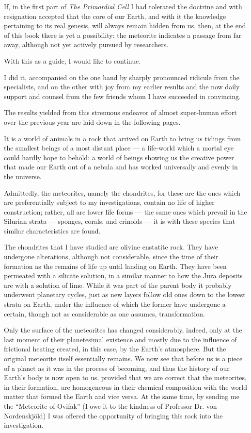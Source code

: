 \documentclass[a4paper, 11pt, oneside]{article}
\begin{document}
If, in the first part of \emph{The Primordial Cell} I had tolerated the doctrine and with resignation accepted that the core of our Earth, and with it the knowledge pertaining to its real genesis, will always remain hidden from us, then, at the end of this book there is yet a possibility: the meteorite indicates a passage from far away, although not yet actively pursued by researchers.

With this as a guide, I would like to continue.

I did it, accompanied on the one hand by sharply pronounced ridicule from the specialists, and on the other with joy from my earlier results and the now daily support and counsel from the few friends whom I have succeeded in convincing.

The results yielded from this strenuous endeavor of almost super-human effort over the previous year are laid down in the following pages.

It is a world of animals in a rock that arrived on Earth to bring us tidings from the smallest beings of a most distant place — a life-world which a mortal eye could hardly hope to behold: a world of beings showing us the creative power that made our Earth out of a nebula and has worked universally and evenly in the universe.

Admittedly, the meteorites, namely the chondrites, for these are the ones which are preferentially subject to my investigations, contain no life of higher construction; rather, all are lower life forms — the same ones which prevail in the Silurian strata — sponges, corals, and crinoids — it is with these species that similar characteristics are found.

The chondrites that I have studied are olivine enstatite rock. They have undergone alterations, although not considerable, since the time of their formation as the remains of life up until landing on Earth. They have been permeated with a silicate solution, in a similar manner to how the Jura deposits are with a solution of lime. While it was part of the parent body it probably underwent planetary cycles, just as new layers follow old ones down to the lowest strata on Earth, under the influence of which the former have undergone a certain, though not as considerable as one assumes, transformation.

Only the surface of the meteorites has changed considerably, indeed, only at the last moment of their planetesimal existence and mostly due to the influence of frictional heating created, in this case, by the Earth's atmosphere. But the original meteorite itself essentially remains. We now see that before us is a piece of a planet as it was in the process of becoming, and thus the history of our Earth's body is now open to us, provided that we are correct that the meteorites, in their formation, are homogeneous in their chemical composition with the world matter that formed the Earth and vice versa. At the same time, by sending me the ``Meteorite of Ovifak'' (I owe it to the kindness of Professor Dr. von Nordenskjöld) I was offered the opportunity of bringing this rock into the investigation.
\end{document}
